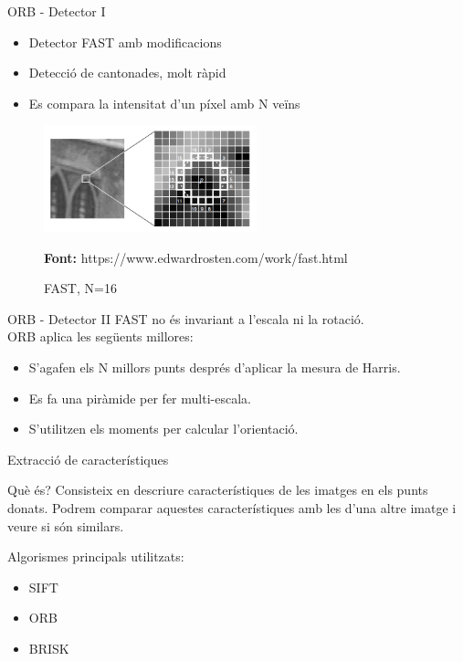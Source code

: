\documentclass[xcolor=table, 11pt]{beamer}
\newcommand*{\captionsource}[2]{%
  \caption[{#1}]{#1}\par
  \vspace{-0.4cm}
  \tiny{\textbf{Font:} #2\par}}
\newcommand\tz{\fontsize{13}{15.6}\selectfont}
\begin{document}
	\begin{frame}{ORB - Detector I}
		\tz
		\begin{itemize}
			\item{Detector FAST\cite{Rosten:2006:MLH:2094437.2094478} amb modificacions}
			\item{Detecció de cantonades, molt ràpid}
			\item{Es compara la intensitat d'un píxel amb N veïns}
		\end{itemize}
		\begin{figure}[H]
			\centering
			\includegraphics[width=0.55\textwidth]{images/fast}
			\captionsource{FAST, N=16}{https://www.edwardrosten.com/work/fast.html}
		\end{figure}
	\end{frame}

	\begin{frame}{ORB - Detector II}
		\tz
		FAST no és invariant a l'escala ni la rotació.\\\vspace{0.5cm}
		ORB aplica les següents millores:\\

		\begin{itemize}
			\item{S'agafen els N millors punts després d'aplicar la mesura de Harris.}
			\item{Es fa una piràmide per fer multi-escala.}
			\item{S'utilitzen els moments per calcular l'orientació.}
		\end{itemize}
	\end{frame}

	\begin{frame}{Extracció de característiques}
		\tz
		\begin{block}{Què és?}
			Consisteix en descriure característiques de les imatges en els punts donats. Podrem comparar aquestes característiques amb les d'una altre imatge i veure si són similars.
		\end{block}
		Algorismes principals utilitzats:
		\begin{itemize}
			\item SIFT
			\item ORB
			\item BRISK\cite{Leutenegger:2011:BBR:2355573.2356277}
		\end{itemize}
	\end{frame}
\end{document}
